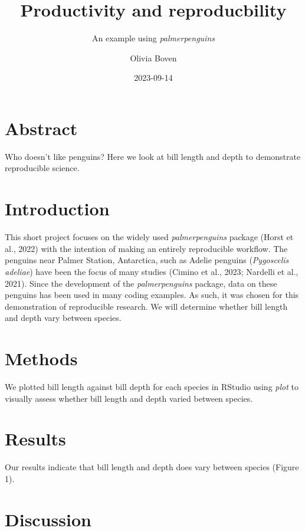 \documentclass[
]{article}
\title{Productivity and reproducbility}
\subtitle{An example using \emph{palmerpenguins}}
\author{Olivia Boven}
\date{2023-09-14}
\begin{document}
\maketitle

\newpage

\hypertarget{abstract}{%
\section{Abstract}\label{abstract}}

Who doesn't like penguins? Here we look at bill length and depth to
demonstrate reproducible science.

\newpage

\hypertarget{introduction}{%
\section{Introduction}\label{introduction}}

This short project focuses on the widely used \emph{palmerpenguins}
package (Horst et al., 2022) with the intention of making an entirely
reproducible workflow. The penguins near Palmer Station, Antarctica,
such as Adelie penguins (\emph{Pygoscelis adeliae}) have been the focus
of many studies (Cimino et al., 2023; Nardelli et al., 2021). Since the
development of the \emph{palmerpenguins} package, data on these penguins
has been used in many coding examples. As such, it was chosen for this
demonstration of reproducible research. We will determine whether bill
length and depth vary between species.

\hypertarget{methods}{%
\section{Methods}\label{methods}}

We plotted bill length against bill depth for each species in RStudio
using \emph{plot} to visually assess whether bill length and depth
varied between species.

\hypertarget{results}{%
\section{Results}\label{results}}

Our results indicate that bill length and depth does vary between
species (Figure 1).

\hypertarget{discussion}{%
\section{Discussion}\label{discussion}}
\end{document}
